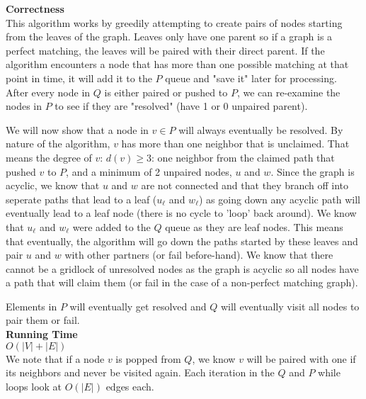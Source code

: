 \documentclass{article}
\begin{document}
\normalsize

\textbf{Correctness}\\
This algorithm works by greedily attempting to create pairs of nodes starting from the leaves of the graph.
Leaves only have one parent so if a graph is a perfect matching, the leaves will be paired with their direct parent.
If the algorithm encounters a node that has more than one possible matching at that point in time, it will add it to the $P$ queue
and "save it" later for processing. After every node in $Q$ is either paired or pushed to $P$, we can re-examine the nodes in $P$ to see if they are "resolved" (have 1 or 0 unpaired parent).

We will now show that a node in $v \in P$ will always eventually be resolved. By nature of the algorithm, $v$ has more than one neighbor that is unclaimed.
That means the degree of $v$: $d(v) \geq 3$: one neighbor from the claimed path that pushed $v$ to $P$, and a minimum of 2 unpaired nodes, $u$ and $w$.
Since the graph is acyclic, we know that $u$ and $w$ are not connected and that they branch off into seperate paths that lead to a leaf ($u_\ell$ and $w_\ell$)
as going down any acyclic path will eventually lead to a leaf node (there is no cycle to 'loop' back around).
We know that $u_\ell$ and $w_\ell$ were added to the $Q$ queue as they are leaf nodes. This means that eventually, the algorithm will go down
the paths started by these leaves and pair $u$ and $w$ with other partners (or fail before-hand). We know that there cannot be a gridlock of unresolved
nodes as the graph is acyclic so all nodes have a path that will claim them (or fail in the case of a non-perfect matching graph). 

Elements in $P$ will eventually get resolved and $Q$ will eventually visit all nodes to pair them or fail.\\


\textbf{Running Time}\\
$O(|V| + |E|)$ \\
We note that if a node $v$ is popped from $Q$, we know $v$ will be paired with one if its neighbors and never be visited again.
Each iteration in the $Q$ and $P$ while loops look at $O(|E|)$ edges each. 
 
\end{document}

